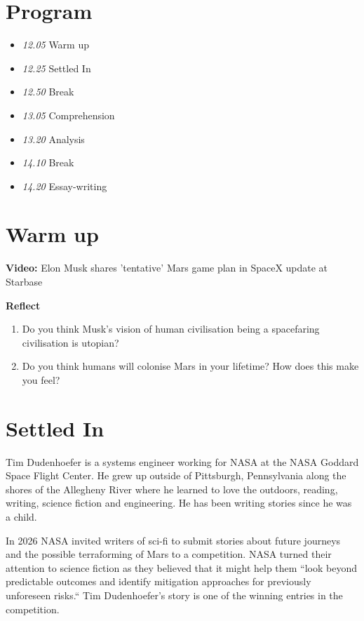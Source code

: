 \documentclass[11pt,a4paper,oneside]{book}
\newcommand{\tasktitle}[1]{{\color{blue}\bfseries #1}\par\smallskip}
\begin{document}
\section*{Program}

\begin{itemize}
\item \emph{12.05} Warm up
\item \emph{12.25} Settled In
\item \emph{12.50} Break
\item \emph{13.05} Comprehension
\item \emph{13.20} Analysis
\item \emph{14.10} Break
\item \emph{14.20} Essay-writing
\end{itemize}

\section*{Warm up}

\par\noindent\textbf{Video:} Elon Musk shares 'tentative' Mars game plan in SpaceX update at Starbase\par\medskip
\begin{taskbox}
\tasktitle{Reflect}
\begin{enumerate}
\item Do you think Musk's vision of human civilisation being a spacefaring civilisation is utopian?
\item Do you think humans will colonise Mars in your lifetime? How does this make you feel?
\end{enumerate}
\end{taskbox}

\section*{Settled In}
Tim Dudenhoefer is a systems engineer working for NASA at the NASA Goddard Space Flight Center. He grew up outside of Pittsburgh, Pennsylvania along the shores of the Allegheny River where he learned to love the outdoors, reading, writing, science fiction and engineering. He has been writing stories since he was a child.

In 2026 NASA invited writers of sci-fi to submit stories about future journeys and the possible terraforming of Mars to a competition. NASA turned their attention to science fiction as they believed that it might help them “look beyond predictable outcomes and identify mitigation approaches for previously unforeseen risks.“ Tim Dudenhoefer’s story is one of the winning entries in the competition.
\end{document}
